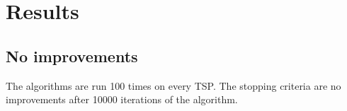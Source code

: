 \section{Results}
\subsection{No improvements}
The algorithms are run 100 times on every TSP. The stopping criteria are no improvements after 10000 iterations of the algorithm. 